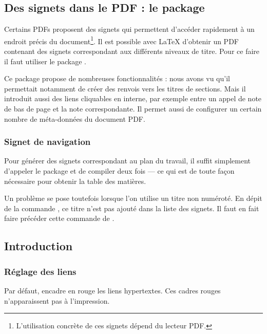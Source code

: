 \section{Des signets dans le PDF : le package }\label{hyperref}


Certains PDFs proposent des signets qui permettent d'accéder rapidement à un endroit précis du document\footnote{L'utilisation concrète de ces signets dépend du lecteur PDF.}. Il est possible avec \LaTeX{} d'obtenir un PDF contenant des signets correspondant aux différents niveaux de titre. Pour ce faire il faut utiliser le package .

Ce package propose de nombreuses fonctionnalités :  nous avons vu  qu'il permettait notamment de créer des renvois vers les titres de sections.
Mais il introduit aussi des liens cliquables en interne, par exemple entre un appel de note de bas de page et la note correspondante. Il permet aussi de configurer un certain nombre de méta-données du document PDF.

\subsection{Signet de navigation}

Pour générer des signets correspondant au plan du travail, il suffit simplement d'appeler le package et de compiler deux fois --- ce qui est de toute façon nécessaire pour obtenir la table des matières.

Un problème se pose toutefois lorsque l'on utilise un titre non numéroté. En dépit de  la commande , ce titre n'est pas ajouté dans la liste des signets. Il faut en fait faire précéder cette commande de .

\begin{latexcode}
{}
\chapter*{Introduction}
\end{latexcode}

\subsection{Réglage des liens}
Par défaut,  encadre en rouge les liens hypertextes. Ces cadres rouges n'apparaissent pas à l'impression.

